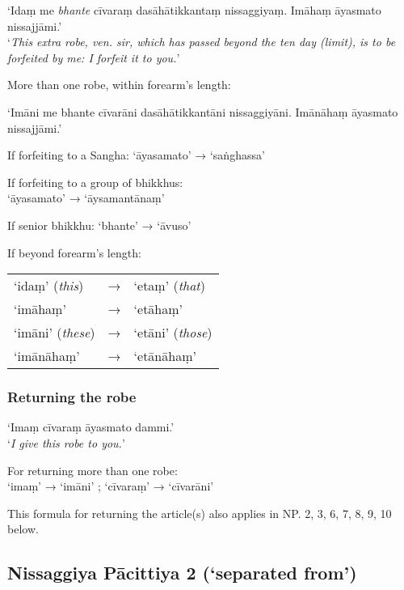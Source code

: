 ‘Idaṃ me \emph{bhante} cīvaraṃ dasāhātikkantaṃ nissaggiyaṃ. Imāhaṃ āyasmato nissajjāmi.’\\
‘\emph{This extra robe, ven. sir, which has passed beyond the ten day (limit), is
  to be forfeited by me: I forfeit it to you.}’

More than one robe, within forearm's length:

‘Imāni me bhante cīvarāni dasāhātikkantāni nissaggiyāni. Imānāhaṃ āyasmato nissajjāmi.’

If forfeiting to a Sangha: ‘āyasamato’ → ‘saṅghassa’ 

If forfeiting to a group of bhikkhus:\\
‘āyasamato’ → ‘āysamantānaṃ’

If senior bhikkhu: ‘bhante’ → ‘āvuso’

If beyond forearm's length:

\begin{tabular}{@{}lll@{}}
‘idaṃ’ (\emph{this}) & → & ‘etaṃ’ (\emph{that}) \\
‘imāhaṃ’             & → & ‘etāhaṃ’             \\
‘imāni’ (\emph{these}) & → & ‘etāni’ (\emph{those})\\
‘imānāhaṃ’             & → & ‘etānāhaṃ’\\
\end{tabular}


\vspace*{-\baselineskip}

\subsubsection{Returning the robe}
\label{np-1-returning-the-robe}

‘Imaṃ cīvaraṃ āyasmato dammi.’\\
‘\emph{I give this robe to you.}’ 

For returning more than one robe:\\
‘imaṃ’ → ‘imāni’ ; ‘cīvaraṃ’ → ‘cīvarāni’

This formula for returning the article(s) also applies in NP. 2, 3, 6, 7, 8, 9,
10 below.

\subsection[NP 2 (‘separated from’)]{Nissaggiya Pācittiya 2 (‘separated from’)}

